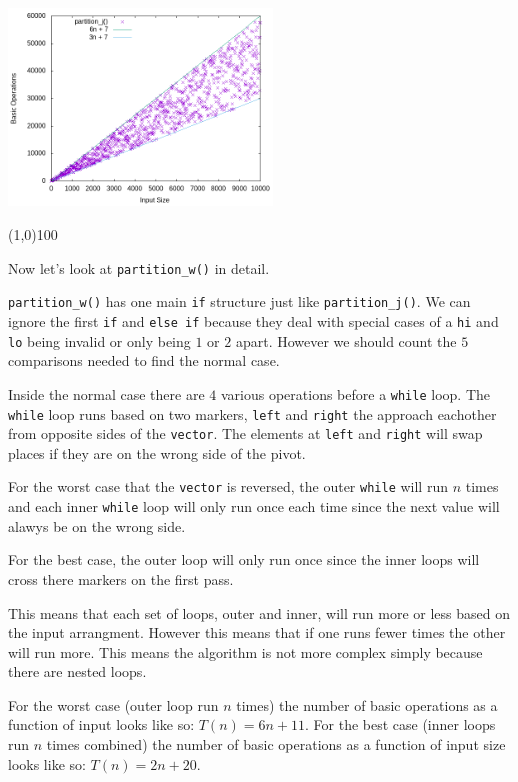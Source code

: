 \documentclass[11pt]{article}
\begin{document}
\begin{center}
  \includegraphics[width=0.525\textwidth]{p1_1.png}
\end{center}

\begin{center}
\line(1,0){100}
\end{center}

Now let's look at \texttt{partition\_w()} in detail.

\texttt{partition\_w()} has one main \texttt{if} structure just like
\texttt{partition\_j()}. We can ignore the first \texttt{if} and
\texttt{else if} because they deal with special cases of a \texttt{hi} and
\texttt{lo} being invalid or only being $1$ or $2$ apart. However we should
count the $5$ comparisons needed to find the normal case.

Inside the normal case there are $4$ various operations before a
\texttt{while} loop. The \texttt{while} loop runs based on two markers,
\texttt{left} and \texttt{right} the approach eachother from opposite sides of
the \texttt{vector}. The elements at \texttt{left} and \texttt{right} will
swap places if they are on the wrong side of the pivot.

For the worst case that the \texttt{vector} is reversed, the outer
\texttt{while} will run $n$ times and each inner \texttt{while} loop will only
run once each time since the next value will alawys be on the wrong side.

For the best case, the outer loop will only run once since the inner loops
will cross there markers on the first pass.

This means that each set of loops, outer and inner, will run more or less
based on the input arrangment. However this means that if one runs fewer times
the other will run more. This means the algorithm is not more complex simply
because there are nested loops.

For the worst case (outer loop run $n$ times) the number of basic operations
as a function of input looks like so: $T(n) = 6n + 11$. For the best case
(inner loops run $n$ times combined) the number of basic operations as a
function of input size looks like so: $T(n) = 2n + 20$.
\end{document}

